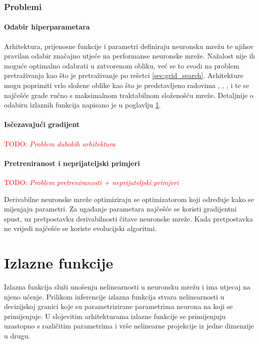 \documentclass[times, utf8, diplomski]{fer}
\def\TODO#1{\noindent\textcolor{red}{TODO: \textit{#1}}\newline}
\def\todo#1{\TODO{#1}}
\begin{document}
\subsection{Problemi}
\subsubsection{Odabir hiperparametara}
Arhitektura, prijenosne funkcije i parametri definiraju neuronsku mrežu te njihov pravilan odabir značajno utjeće na performanse neuronske mreže. Nažalost nije ih moguće optimalno odabrati u zatvorenom obliku, već se to svodi na problem pretraživanja kao što je pretraživanje po rešetci \ref{sec:grid_search}. Arhitekture mogu poprimiti vrlo složene oblike kao što je predstavljeno radovima \citet{highway}, \citet{resnet}, \citet{densenet}, \citet{inceptionnet} i \citet{yolo} te se najčešće grade ručno s maksimalnom traktabilnom složenošću mreže. Detaljnije o odabiru izlaznih funkcija napisano je u poglavlju \ref{sec:izlazne_fje}.

\subsubsection{Isčezavajući gradijent}
\label{sec:iscezavajuci_grad}
\todo{Problem dubokih arhitektura}

\subsubsection{Pretreniranost i neprijateljski primjeri}
\todo{Problem pretreniranosti + neprijateljski primjeri}

Derivabilne neuronske mreže optimiziraju se optimizatorom koji određuje kako se mijenjaju parametri. Za ugađanje parametara najčešće se koristi gradijentni spust, uz pretpostavku derivabilnosti čitave neuronske mreže. Kada pretpostavka ne vrijedi najčešće se koriste evolucijski algoritmi.

\chapter{Izlazne funkcije}
\label{sec:izlazne_fje}
Izlazna funkcija služi unošenju nelinearnosti u neuronsku mrežu i ima utjecaj na njeno učenje. Prilikom inferencije izlazna funkcija stvara nelinearnosti u decizijskoj granici koje su parametrizirane parametrima neurona na koji se primijenjuje. U slojevitim arhitekturama izlazne funkcije se primijenjuju uzastopno s različitim parametrima i vrše nelinearne projekcije iz jedne dimenzije u drugu.
\end{document}
